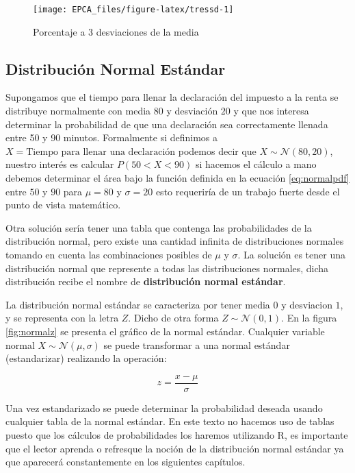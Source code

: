 \documentclass[
]{krantz}
\begin{document}
\begin{figure}[h!]

{\centering \texttt{[image: EPCA\_files/figure-latex/tressd-1]} 

}

\caption{Porcentaje a 3 desviaciones de la media}\label{fig:tressd}
\end{figure}

\hypertarget{dne}{%
\subsection{Distribución Normal Estándar}\label{dne}}

Supongamos que el tiempo para llenar la declaración del impuesto a la renta se distribuye normalmente con media \(80\) y desviación \(20\) y que nos interesa determinar la probabilidad de que una declaración sea correctamente llenada entre 50 y 90 minutos. Formalmente si definimos a \(X=\text{Tiempo para llenar una declaración}\) podemos decir que \(X \sim \mathcal{N}\left(80,20\right)\), nuestro interés es calcular \(P\left(50< X <90\right)\) si hacemos el cálculo a mano debemos determinar el área bajo la función definida en la ecuación \eqref{eq:normalpdf} entre \(50\) y \(90\) para \(\mu=80\) y \(\sigma=20\) esto requeriría de un trabajo fuerte desde el punto de vista matemático.

Otra solución sería tener una tabla que contenga las probabilidades de la distribución normal, pero existe una cantidad infinita de distribuciones normales tomando en cuenta las combinaciones posibles de \(\mu\) y \(\sigma\). La solución es tener una distribución normal que represente a todas las distribuciones normales, dicha distribución recibe el nombre de \textbf{distribución normal estándar}.

La distribución normal estándar se caracteriza por tener media \(0\) y desviacion \(1\), y se representa con la letra \(Z\). Dicho de otra forma \(Z \sim \mathcal{N}\left(0,1\right)\). En la figura \ref{fig:normalz} se presenta el gráfico de la normal estándar.
Cualquier variable normal \(X\sim \mathcal{N}\left(\mu,\sigma\right)\) se puede transformar a una normal estándar (estandarizar) realizando la operación:

\begin{equation} 
z=\dfrac{x-\mu}{\sigma}
\label{eq:normalest}
\end{equation}

Una vez estandarizado se puede determinar la probabilidad deseada usando cualquier tabla de la normal estándar. En este texto no hacemos uso de tablas puesto que los cálculos de probabilidades los haremos utilizando R, es importante que el lector aprenda o refresque la noción de la distribución normal estándar ya que aparecerá constantemente en los siguientes capítulos.
\end{document}
